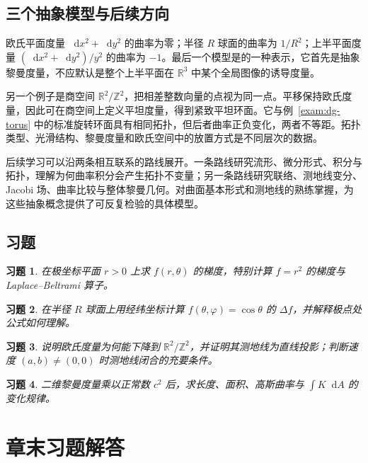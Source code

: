 \documentclass[UTF8,12pt,a4paper,fontset=fandol]{ctexbook}
\newcommand{\R}{\mathbb R}
\newcommand{\dd}{\mathop{}\!\mathrm d}
\newtheorem{exercise}{习题}[chapter]
\begin{document}
\section{三个抽象模型与后续方向}
欧氏平面度量 $\dd x^2+\dd y^2$ 的曲率为零；半径 $R$ 球面的曲率为 $1/R^2$；上半平面度量 $(\dd x^2+\dd y^2)/y^2$ 的曲率为 $-1$。最后一个模型是的一种表示，它首先是抽象黎曼度量，不应默认是整个上半平面在 $\R^3$ 中某个全局图像的诱导度量。

另一个例子是商空间 $\R^2/\mathbb Z^2$，把相差整数向量的点视为同一点。平移保持欧氏度量，因此可在商空间上定义平坦度量，得到紧致平坦环面。它与例~\ref{exam:dg-torus} 中的标准旋转环面具有相同拓扑，但后者曲率正负变化，两者不等距。拓扑类型、光滑结构、黎曼度量和欧氏空间中的放置方式是不同层次的数据。

后续学习可以沿两条相互联系的路线展开。一条路线研究流形、微分形式、积分与拓扑，理解为何曲率积分会产生拓扑不变量；另一条路线研究联络、测地线变分、Jacobi 场、曲率比较与整体黎曼几何。对曲面基本形式和测地线的熟练掌握，为这些抽象概念提供了可反复检验的具体模型。

\section{习题}
\begin{exercise}\label{ex:dg-manifolds-gradient}
在极坐标平面 $r>0$ 上求 $f(r,\theta)$ 的梯度，特别计算 $f=r^2$ 的梯度与 Laplace--Beltrami 算子。
\end{exercise}
\begin{exercise}\label{ex:dg-manifolds-sphere-laplace}
在半径 $R$ 球面上用经纬坐标计算 $f(\theta,\varphi)=\cos\theta$ 的 $\Delta f$，并解释极点处公式如何理解。
\end{exercise}
\begin{exercise}\label{ex:dg-manifolds-flat-torus}
说明欧氏度量为何能下降到 $\R^2/\mathbb Z^2$，并证明其测地线为直线投影；判断速度 $(a,b)\ne(0,0)$ 时测地线闭合的充要条件。
\end{exercise}
\begin{exercise}\label{ex:dg-manifolds-scale}
二维黎曼度量乘以正常数 $c^2$ 后，求长度、面积、高斯曲率与 $\int K\dd A$ 的变化规律。
\end{exercise}

\appendix
\chapter{章末习题解答}
\label{app:dg-solutions}
\end{document}
